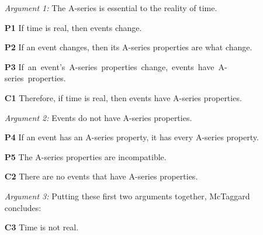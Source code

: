 \documentclass[a4paper, 11pt]{article} %
\begin{document}
\begin{itemize}
  \item[\it Argument 1:] The A-series is essential to the reality of time.
    \item[\bf P1] If time is real, then events change.
    \item[\bf P2] If an event changes, then its A-series properties are what change.
    \item[\bf P3] \mbox{If an event's A-series properties change, events have A-series properties.}
    \item[\bf C1] Therefore, if time is real, then events have A-series properties.
  \item[\it Argument 2:] Events do not have A-series properties.
    \item[\bf P4] If an event has an A-series property, it has every A-series property.
    \item[\bf P5] The A-series properties are incompatible.
    \item[\bf C2] There are no events that have A-series properties. 
  \item[\it Argument 3:] Putting these first two arguments together, McTaggard concludes:
    \item[\bf C3] Time is not real.
\end{itemize}
\end{document}
